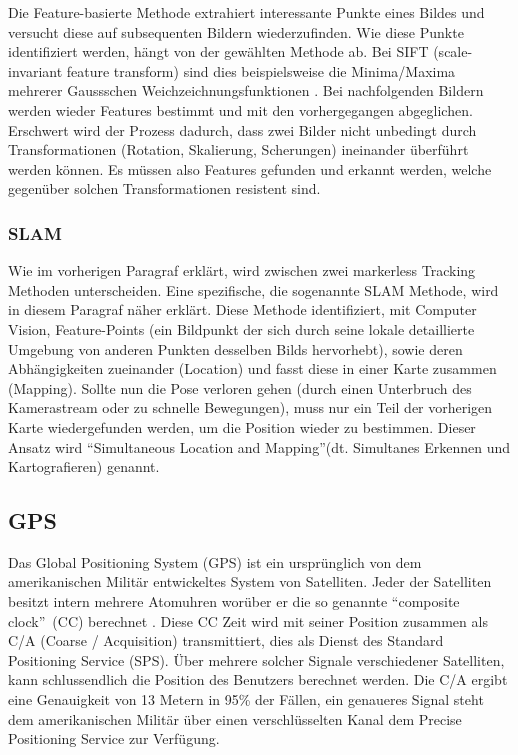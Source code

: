 \documentclass[a4paper]{scrreprt}
\begin{document}
Die Feature-basierte Methode extrahiert interessante Punkte eines Bildes und versucht diese auf subsequenten Bildern wiederzufinden. Wie diese Punkte identifiziert werden, hängt von der gewählten Methode ab. Bei SIFT (scale-invariant feature transform) sind dies beispielsweise die Minima/Maxima mehrerer Gaussschen Weichzeichnungsfunktionen \parencite{Lowe1999}. Bei nachfolgenden Bildern werden wieder Features bestimmt und mit den vorhergegangen abgeglichen. Erschwert wird der Prozess dadurch, dass zwei Bilder nicht unbedingt durch Transformationen (Rotation, Skalierung, Scherungen) ineinander überführt werden können. Es müssen also Features gefunden und erkannt werden, welche gegenüber solchen Transformationen resistent sind.

\subsubsection{SLAM}
Wie im vorherigen Paragraf erklärt, wird zwischen zwei markerless Tracking Methoden unterscheiden. Eine spezifische, die sogenannte SLAM Methode, wird in diesem Paragraf näher erklärt. Diese Methode identifiziert, mit Computer Vision, Feature-Points (ein Bildpunkt der sich durch seine lokale detaillierte Umgebung von anderen Punkten desselben Bilds hervorhebt), sowie deren Abhängigkeiten zueinander (Location) und fasst diese in einer Karte zusammen (Mapping). Sollte nun die Pose verloren gehen (durch einen Unterbruch des Kamerastream oder zu schnelle Bewegungen), muss nur ein Teil der vorherigen Karte wiedergefunden werden, um die Position wieder zu bestimmen. Dieser Ansatz wird \textquotedblleft Simultaneous Location and Mapping\textquotedblright (dt. Simultanes Erkennen und Kartografieren) genannt.

\subsection{GPS}
Das Global Positioning System (GPS) ist ein ursprünglich von dem amerikanischen Militär entwickeltes System von Satelliten. Jeder der Satelliten besitzt intern mehrere Atomuhren worüber er die so genannte \textquotedblleft composite clock\textquotedblright\ (CC) berechnet \parencite{GPSSysDesc2009}. Diese CC Zeit wird mit seiner Position zusammen als C/A (Coarse / Acquisition) transmittiert, dies als Dienst des Standard Positioning Service (SPS). Über mehrere solcher Signale verschiedener Satelliten, kann schlussendlich die Position des Benutzers berechnet werden. Die C/A ergibt eine Genauigkeit von 13 Metern in 95\% der Fällen, ein genaueres Signal steht dem amerikanischen Militär über einen verschlüsselten Kanal dem Precise Positioning Service zur Verfügung.
\end{document}

